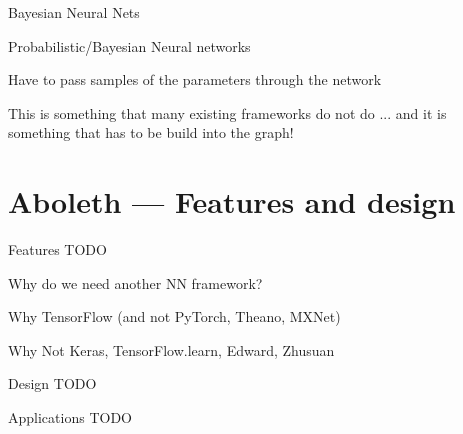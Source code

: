 \documentclass[lualatex, aspectratio=169]{beamer}
\begin{document}
\begin{frame}{Bayesian Neural Nets}

  Probabilistic/Bayesian Neural networks

  Have to pass samples of the parameters through the network

  This is something that many existing frameworks do not do ... and it is something that has
  to be build into the graph!

\end{frame}


\section{Aboleth --- Features and design}


\begin{frame}{Features}
  TODO
\end{frame}


\begin{frame}{Why do we need another NN framework?}

  Why TensorFlow (and not PyTorch, Theano, MXNet)

  Why Not Keras, TensorFlow.learn, Edward, Zhusuan

\end{frame}


\begin{frame}{Design}
  TODO
\end{frame}


\begin{frame}{Applications}
  TODO  
\end{frame}
\end{document}
